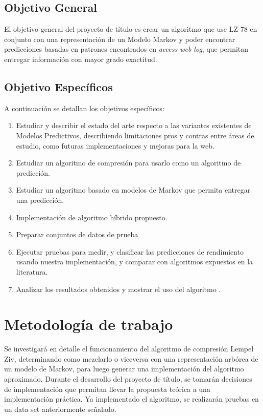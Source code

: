 \documentclass{udparticle}
\begin{document}
\subsection{Objetivo General}
 
El objetivo general del proyecto de título es crear un algoritmo que use LZ-78 en conjunto con una representación de un Modelo Markov y  poder encontrar predicciones basadas en patrones encontrados en \emph{access web log}, que permitan entregar información con mayor grado exactitud.
 
\subsection{Objetivo  Específicos }
 
A continuación se detallan los objetivos específicos:
 
\begin{enumerate}
  \item Estudiar y describir el estado del arte respecto a las variantes existentes de Modelos Predictivos, describiendo limitaciones pros y contras entre áreas de estudio, como futuras implementaciones y mejoras para la web.
  \item Estudiar un algoritmo de compresión para usarlo como un algoritmo de predicción.
  \item Estudiar un algoritmo basado en modelos de Markov que permita entregar una predicción.
  \item Implementación de algoritmo híbrido propuesto.
  \item Preparar conjuntos de datos de prueba 
  \item Ejecutar pruebas para medir, y clasificar las predicciones de rendimiento usando nuestra implementación, y comparar con algoritmos expuestos en la literatura.
  \item Analizar los resultados obtenidos y mostrar el uso del algoritmo .
\end{enumerate}


\section{Metodología de trabajo}

Se investigará en detalle el funcionamiento del algoritmo de compresión Lempel Ziv, determinando como mezclarlo o viceversa con una representación arbórea de un modelo de Markov, para luego generar una implementación del algoritmo aproximado.
Durante el desarrollo del proyecto de título, se tomarán decisiones de implementación que permitan llevar la propuesta teórica a una implementación práctica. Ya implementado el algoritmo, se realizarán pruebas en un data set anteriormente señalado.
\end{document}
